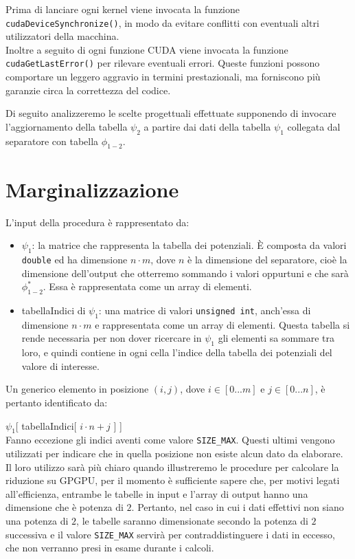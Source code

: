\documentclass[a4paper]{article}   %
\begin{document}
Prima di lanciare ogni kernel viene invocata la funzione {\tt cudaDeviceSynchronize()}, in modo da evitare conflitti con eventuali altri utilizzatori della macchina.\\
Inoltre a seguito di ogni funzione CUDA viene invocata la funzione {\tt cudaGetLastError()} per rilevare eventuali errori.
Queste funzioni possono comportare un leggero aggravio in termini prestazionali, ma forniscono più garanzie circa la correttezza del codice.

Di seguito analizzeremo le scelte progettuali effettuate supponendo di invocare l'aggiornamento della tabella $\psi_2$ a partire dai dati della tabella $\psi_1$ collegata dal separatore con tabella $\phi_{1-2}$.

\section{Marginalizzazione}

L'input della procedura è rappresentato da:
\begin{itemize}
\item $\psi_1$: la matrice che rappresenta la tabella dei potenziali. \`E composta da valori {\tt double} ed ha dimensione $n \cdot m$, dove $n$ è la dimensione del separatore, cioè la dimensione dell'output che otterremo sommando i valori oppurtuni e che sarà $\phi_{1-2}^*$. Essa è rappresentata come un array di elementi.
\item tabellaIndici di $\psi_1$: una matrice di valori {\tt unsigned int}, anch’essa di dimensione $n \cdot m$ e rappresentata come un array di elementi. Questa tabella si rende necessaria per non dover ricercare in $\psi_1$ gli elementi sa sommare tra loro, e quindi contiene in ogni cella l’indice della tabella dei potenziali del valore di interesse.
\end{itemize}

Un generico elemento in posizione $(i, j)$, dove $i \in [0...m]$ e $j \in [0...n]$,
è pertanto identificato da:

$\psi_1$[ tabellaIndici[ $i \cdot n + j$ ] ]\\
Fanno eccezione gli indici aventi come valore {\tt SIZE\_MAX}. Questi ultimi vengono utilizzati per indicare che in quella posizione non esiste alcun dato da elaborare. \\
Il loro utilizzo sarà più chiaro quando illustreremo le procedure per calcolare la riduzione su GPGPU, per il momento è sufficiente sapere che, per motivi legati all’efficienza, entrambe le tabelle in input e l’array di output hanno una dimensione che è potenza di $2$. Pertanto, nel caso in cui i dati effettivi non siano una potenza di $2$, le tabelle saranno dimensionate secondo la potenza di $2$ successiva e il valore {\tt SIZE\_MAX} servirà per contraddistinguere i dati in eccesso, che non verranno presi in esame durante i calcoli.
\end{document}
